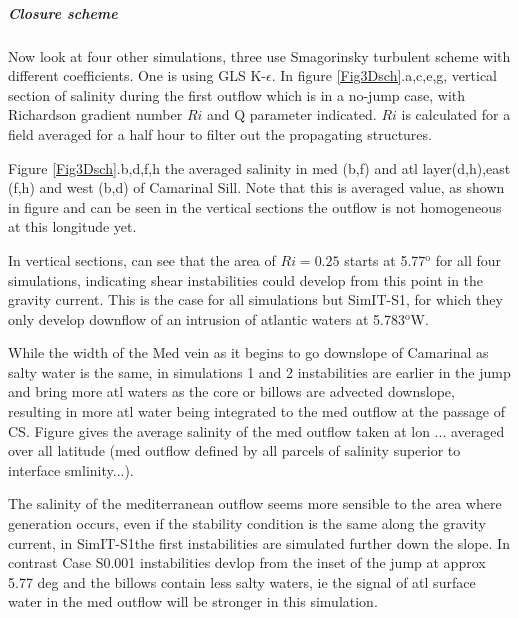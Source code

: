 \subparagraph{Closure scheme}

Now look at four other simulations, three use Smagorinsky turbulent scheme with different coefficients. One is using GLS K-$\epsilon$. In figure \ref{Fig3Dsch}.a,c,e,g, vertical section of salinity during the first outflow which is in a no-jump case, with Richardson gradient number $Ri$ and Q parameter indicated. $Ri$ is calculated for a field averaged for a half hour to filter out the propagating structures.

Figure \ref{Fig3Dsch}.b,d,f,h the averaged salinity in med (b,f) and atl layer(d,h),east (f,h) and west (b,d) of Camarinal Sill. Note that this is averaged value, as shown in figure and can be seen in the vertical sections the outflow is not homogeneous at this longitude yet.

In vertical sections, can see that the area of $Ri=0.25$ starts at 5.77$^\text{o}$ for all four simulations, indicating shear instabilities could develop from this point in the gravity current. This is the case for all simulations but SimIT-S1, for which they only develop downflow of an intrusion of atlantic waters at 5.783$^\text{o}$W. 


While the width of the Med vein as it begins to go downslope of Camarinal as salty water is the same, in simulations 1 and 2 instabilities are earlier in the jump and bring more atl waters as the core or billows are advected downslope, resulting in more atl water being integrated to the med outflow at the passage of CS. Figure gives the average salinity of the med outflow taken at lon ... averaged over all latitude (med outflow defined by all parcels of salinity superior to interface smlinity...).





The salinity of the mediterranean outflow seems more sensible to the area where generation occurs, even if the stability condition is the same along the gravity current, in SimIT-S1the first instabilities are simulated further down the slope. In contrast Case S0.001 instabilities devlop from the inset of the jump at approx 5.77 deg and the billows contain less salty waters, ie the signal of atl surface water in the med outflow will be stronger in this simulation.



